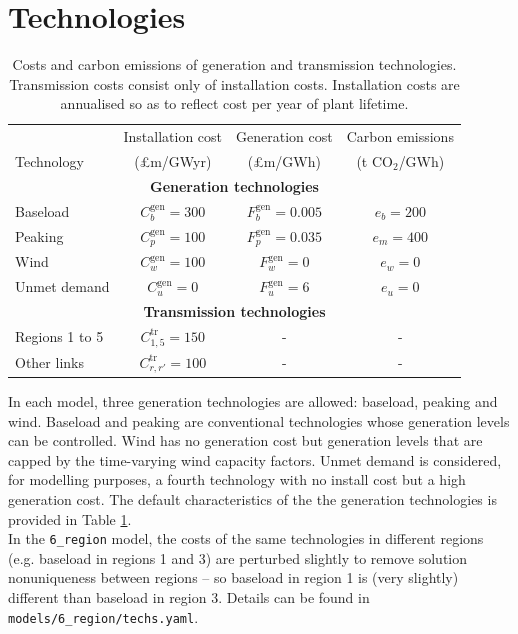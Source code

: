 \documentclass[preprint]{elsarticle}
\begin{document}
\section{Technologies}
\begin{table}
  \centering
\begin{tabular}{ l  c  c  c}
\small
& Installation cost & Generation cost & Carbon emissions\\
Technology &(\pounds m/GWyr) &(\pounds m/GWh) & (t CO$_2$/GWh) \\ \hline
\multicolumn{4}{c}{\textbf{Generation technologies}} \\  
Baseload & $C_b^\text{gen} = 300$ & $F_b^\text{gen} = 0.005$ & $e_b = 200$ \\
Peaking & $C_p^\text{gen} = 100$ & $F_p^\text{gen} = 0.035$ & $e_m = 400$ \\
Wind & $C_w^\text{gen} = 100$ & $F_w^\text{gen} = 0$ & $e_w = 0$ \\
Unmet demand & $C_u^\text{gen} = 0$ & $F_u^\text{gen} = 6$ & $e_u = 0$ \\
\multicolumn{4}{c}{\textbf{Transmission technologies}} \\  
Regions 1 to 5 & $C_{1,5}^\text{tr} = 150$ & - & - \\
Other links & $C_{r,r'}^\text{tr} = 100$ & - & - \\ \hline
\end{tabular} \vspace{1em}
\caption{Costs and carbon emissions of generation and transmission technologies. Transmission costs consist only of installation costs. Installation costs are annualised so as to reflect cost per year of plant lifetime.}
\label{table:tech_characteristics}
\end{table}

\noindent In each model, three generation technologies are allowed: baseload, peaking and wind. Baseload and peaking are conventional technologies whose generation levels can be controlled. Wind has no generation cost but generation levels that are capped by the time-varying wind capacity factors. Unmet demand is considered, for modelling purposes, a fourth technology with no install cost but a high generation cost. The default characteristics of the the generation technologies is provided in Table \ref{table:tech_characteristics}. \\

In the \texttt{6\_region} model, the costs of the same technologies in different regions (e.g. baseload in regions 1 and 3) are perturbed slightly to remove solution nonuniqueness between regions -- so baseload in region 1 is (very slightly) different than baseload in region 3. Details can be found in \texttt{models/6\_region/techs.yaml}.
\end{document}
